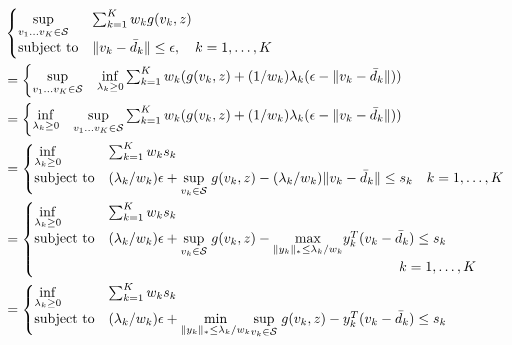 \begin{equation*}
	\begin{aligned}
& \begin{cases}
	\underset{v_1 \dots v_K \in \supp}{\sup} &\sum_{k=1} ^K w_k g(v_k, z) \\
	\mbox{subject to} &  \|v_k - \bar{d}_k\| \le \epsilon, \quad k = 1,\dots,K
\end{cases}\\
&= \begin{cases}
	\underset{v_1 \dots v_K\in \supp}{\sup}  & \underset{\lambda_k \geq 0}{\inf}   \sum_{k=1} ^K  w_k (g(v_k, z)  +  (1/w_k)\lambda_k (\epsilon  - \|v_k - \bar{d}_k\| ))\\
	\end{cases}\\
	&= \begin{cases}
		\underset{\lambda_k \geq 0}{\inf} & \underset{v_1 \dots v_K\in \supp}{\sup}    \sum_{k=1} ^K  w_k  (g(v_k, z)  +  (1/w_k)\lambda_k (\epsilon  - \|v_k - \bar{d}_k\| ))\\
		\end{cases}\\
&= \begin{cases}
	\underset{\lambda_k \geq 0}{\inf} &  \sum_{k=1} ^K  w_k s_k \\
	\mbox{subject to} &   (\lambda_k/w_k)\epsilon + \underset{v_k\in \supp}{\sup}\hspace{1mm} g(v_k, z) -(\lambda_k/w_k)\|v_k - \bar{d}_k\| \le s_k \quad k = 1,\dots,K
\end{cases}\\
&= \begin{cases}
	\underset{\lambda_k \geq 0}{\inf} &  \sum_{k=1} ^K  w_k s_k \\
	\mbox{subject to} & (\lambda_k/w_k)\epsilon + \underset{v_k\in \supp}{\sup}\hspace{1mm} g(v_k, z) -  \underset{\|y_k\|_* \leq \lambda_k/w_k}{\max} y_k^T(v_k - \bar{d}_k)\le s_k\\
	 &\hspace{7cm}\quad k = 1,\dots,K
\end{cases}\\
&= \begin{cases}
	\underset{\lambda_k \geq 0}{\inf} &  \sum_{k=1} ^K  w_k s_k \\
	\mbox{subject to} & (\lambda_k/w_k)\epsilon +  \underset{\|y_k\|_* \leq \lambda_k/w_k}{\min} \underset{v_k\in \supp}{\sup}\hspace{1mm} g(v_k, z) -   y_k^T(v_k - \bar{d}_k)\le s_k\\

\end{cases}
\end{aligned}
\end{equation*}
